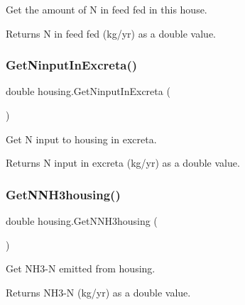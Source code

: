 Get the amount of N in feed fed in this house. 

\begin{DoxyReturn}{Returns}
N in feed fed (kg/yr) as a double value. 
\end{DoxyReturn}
\mbox{\label{classhousing_a0a1d8600d48a183b940e1bdc856a0efa}} 
\subsubsection{\texorpdfstring{GetNinputInExcreta()}{GetNinputInExcreta()}}
{\footnotesize\ttfamily double housing.\+Get\+Ninput\+In\+Excreta (\begin{DoxyParamCaption}{ }\end{DoxyParamCaption})\hspace{0.3cm}{\ttfamily [inline]}}



Get N input to housing in excreta. 

\begin{DoxyReturn}{Returns}
N input in excreta (kg/yr) as a double value. 
\end{DoxyReturn}
\mbox{\label{classhousing_ad09b87a6a7e307b2aa674535ec60db44}} 
\subsubsection{\texorpdfstring{GetNNH3housing()}{GetNNH3housing()}}
{\footnotesize\ttfamily double housing.\+Get\+N\+N\+H3housing (\begin{DoxyParamCaption}{ }\end{DoxyParamCaption})\hspace{0.3cm}{\ttfamily [inline]}}



Get N\+H3-\/N emitted from housing. 

\begin{DoxyReturn}{Returns}
N\+H3-\/N (kg/yr) as a double value. 
\end{DoxyReturn}
\mbox{\label{classhousing_adc0b218cb4e93ed542c55d09979d0dc0}} 

